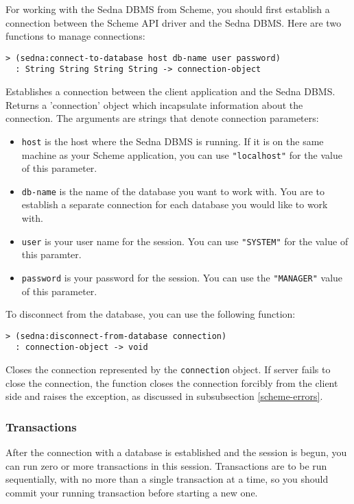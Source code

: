 \documentclass[a4paper,12pt]{article}
\begin{document}
For working with the Sedna DBMS from Scheme, you should first establish a
connection between the Scheme API driver and the Sedna DBMS.
Here are two functions to manage connections:

\begin{verbatim}> (sedna:connect-to-database host db-name user password)
  : String String String String -> connection-object\end{verbatim}

Establishes a connection between the client application and the Sedna DBMS.
Returns a 'connection' object which incapsulate information about the
connection.
The arguments are strings that denote connection parameters:
\begin{itemize}
\item \texttt{host} is the host where the Sedna DBMS is running.
 If it is on the same machine as your Scheme application, you can use
 \texttt{"localhost"} for the value of this parameter.
\item \texttt{db-name} is the name of the database you want to work with.
 You are to establish a separate connection for each database you would like to
 work with.
\item \texttt{user} is your user name for the session.
 You can use \texttt{"SYSTEM"} for the value of this paramter.
\item \texttt{password} is your password for the session.
 You can use the \texttt{"MANAGER"} value of this parameter.
\end{itemize}

To disconnect from the database, you can use the following function:

\begin{verbatim}> (sedna:disconnect-from-database connection)
  : connection-object -> void\end{verbatim}

Closes the connection represented by the \texttt{connection} object.
If server fails to close the connection, the function closes the connection
forcibly from the client side and raises the exception, as discussed 
in subsubsection \ref{scheme-errors}.


\subsubsection{Transactions}

After the connection with a database is established and the session is begun,
you can run zero or more transactions in this session.
Transactions are to be run sequentially, with no more than a single transaction
at a time, so you should commit your running transaction before starting a
new one.
\end{document}
